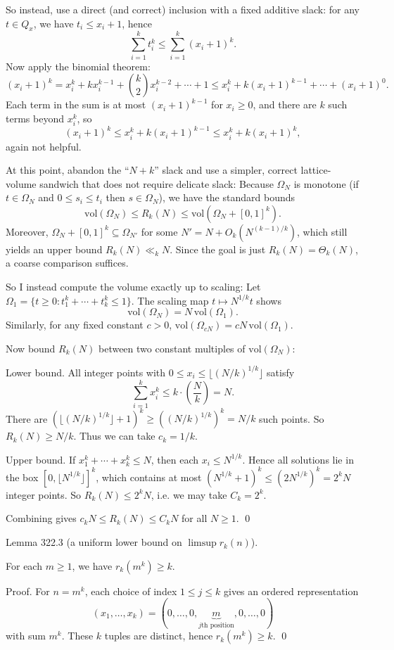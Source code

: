 So instead, use a direct (and correct) inclusion with a fixed additive slack:
for any $t\in Q_x$, we have $t_i\le x_i+1$, hence
\[
\sum_{i=1}^k t_i^k \le \sum_{i=1}^k (x_i+1)^k.
\]
Now apply the binomial theorem:
\[
(x_i+1)^k = x_i^k + kx_i^{k-1} + \binom{k}{2}x_i^{k-2}+\cdots + 1 \le x_i^k + k(x_i+1)^{k-1} + \cdots + (x_i+1)^{0}.
\]
Each term in the sum is at most $(x_i+1)^{k-1}$ for $x_i\ge 0$, and there are $k$ such terms beyond $x_i^k$, so
\[
(x_i+1)^k \le x_i^k + k(x_i+1)^{k-1} \le x_i^k + k(x_i+1)^k,
\]
again not helpful.

At this point, abandon the ``$N+k$'' slack and use a simpler, correct lattice-volume sandwich that does not require delicate slack:
Because $\Omega_N$ is monotone (if $t\in\Omega_N$ and $0\le s_i\le t_i$ then $s\in\Omega_N$), we have the standard bounds
\[
\mathrm{vol}(\Omega_N)\le R_k(N)\le \mathrm{vol}(\Omega_N+[0,1]^k).
\]
Moreover, $\Omega_N+[0,1]^k\subseteq \Omega_{N'}$ for some $N'=N+O_k(N^{(k-1)/k})$, which still yields an upper bound $R_k(N)\ll_k N$.
Since the goal is just $R_k(N)=\Theta_k(N)$, a coarse comparison suffices.

So I instead compute the volume exactly up to scaling:
Let $\Omega_1=\{t\ge 0: t_1^k+\cdots+t_k^k\le 1\}$. The scaling map $t\mapsto N^{1/k}t$ shows
\[
\mathrm{vol}(\Omega_N)=N\,\mathrm{vol}(\Omega_1).
\]
Similarly, for any fixed constant $c>0$, $\mathrm{vol}(\Omega_{cN})=cN\,\mathrm{vol}(\Omega_1)$.

Now bound $R_k(N)$ between two constant multiples of $\mathrm{vol}(\Omega_N)$:

Lower bound.
All integer points with $0\le x_i\le \lfloor (N/k)^{1/k}\rfloor$ satisfy
\[
\sum_{i=1}^k x_i^k \le k\cdot \left(\frac{N}{k}\right)=N.
\]
There are $(\lfloor (N/k)^{1/k}\rfloor+1)^k\ge ((N/k)^{1/k})^k = N/k$ such points.
So $R_k(N)\ge N/k$.
Thus we can take $c_k=1/k$.

Upper bound.
If $x_1^k+\cdots+x_k^k\le N$, then each $x_i\le N^{1/k}$. Hence all solutions lie in the box $[0,\lfloor N^{1/k}\rfloor]^k$, which contains at most $(N^{1/k}+1)^k\le (2N^{1/k})^k=2^k N$ integer points.
So $R_k(N)\le 2^k N$, i.e. we may take $C_k=2^k$.

Combining gives $c_k N\le R_k(N)\le C_k N$ for all $N\ge 1$. \qed


Lemma 322.3 (a uniform lower bound on $\limsup r_k(n)$).

For each $m\ge 1$, we have $r_k(m^k)\ge k$.

Proof.
For $n=m^k$, each choice of index $1\le j\le k$ gives an ordered representation
\[
(x_1,\dots,x_k)=(0,\dots,0,\underbrace{m}_{j\text{th position}},0,\dots,0)
\]
with sum $m^k$. These $k$ tuples are distinct, hence $r_k(m^k)\ge k$. \qed


